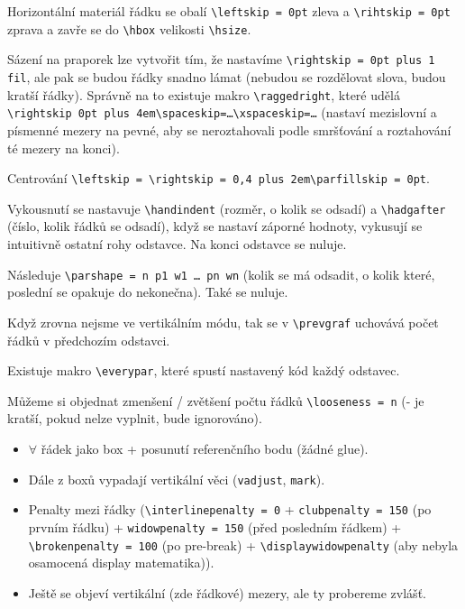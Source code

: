 \documentclass[12pt]{article}					%
\begin{document}
    \begin{poznamka}
        Horizontální materiál řádku se obalí \verb|\leftskip = 0pt| zleva a \verb|\rihtskip = 0pt| zprava a zavře se do \verb|\hbox| velikosti \verb|\hsize|.

        Sázení na praporek lze vytvořit tím, že nastavíme \verb|\rightskip = 0pt plus 1 fil|, ale pak se budou řádky snadno lámat (nebudou se rozdělovat slova, budou kratší řádky). Správně na to existuje makro \verb|\raggedright|, které udělá \verb|\rightskip 0pt plus 4em\spaceskip=…\xspaceskip=…| (nastaví mezislovní a písmenné mezery na pevné, aby se neroztahovali podle smršťování a roztahování té mezery na konci).

        Centrování \verb|\leftskip = \rightskip = 0,4 plus 2em\parfillskip = 0pt|.
    \end{poznamka}

    \begin{poznamka}
        Vykousnutí se nastavuje \verb|\handindent| (rozměr, o kolik se odsadí) a \verb|\hadgafter| (číslo, kolik řádků se odsadí), když se nastaví záporné hodnoty, vykusují se intuitivně ostatní rohy odstavce. Na konci odstavce se nuluje.

        Následuje \verb|\parshape = n p1 w1 … pn wn| (kolik se má odsadit, o kolik které, poslední se opakuje do nekonečna). Také se nuluje.

        Když zrovna nejsme ve vertikálním módu, tak se v \verb|\prevgraf| uchovává počet řádků v předchozím odstavci.

        Existuje makro \verb|\everypar|, které spustí nastavený kód každý odstavec.

        Můžeme si objednat zmenšení / zvětšení počtu řádků \verb|\looseness = n| (- je kratší, pokud nelze vyplnit, bude ignorováno). 
    \end{poznamka}

    \begin{poznamka}
        \begin{itemize}
            \item $\forall$ řádek jako box + posunutí referenčního bodu (žádné glue).
            \item Dále z boxů vypadají vertikální věci (\verb|vadjust|, \verb|mark|).
            \item Penalty mezi řádky (\verb|\interlinepenalty = 0| + \verb|clubpenalty = 150| (po prvním řádku) + \verb|widowpenalty = 150| (před posledním řádkem) + \verb|\brokenpenalty = 100| (po pre-break) + \verb|\displaywidowpenalty| (aby nebyla osamocená display matematika)).
            \item Ještě se objeví vertikální (zde řádkové) mezery, ale ty probereme zvlášť.
        \end{itemize}
    \end{poznamka}
\end{document}
